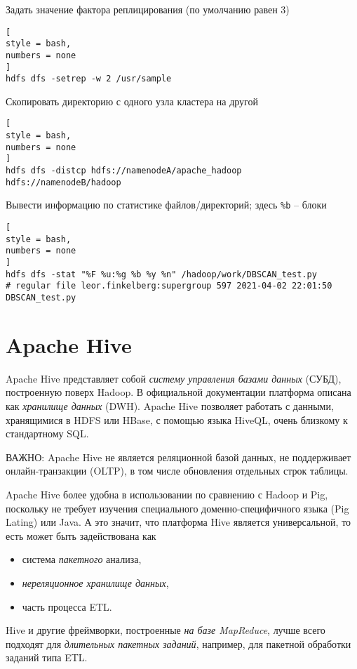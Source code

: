 \documentclass[%
	11pt,
	a4paper,
	utf8,
		]{article}
\begin{document}
Задать значение фактора реплицирования (по умолчанию равен 3)
\begin{lstlisting}[
style = bash,
numbers = none	
]
hdfs dfs -setrep -w 2 /usr/sample
\end{lstlisting}

Скопировать директорию с одного узла кластера на другой
\begin{lstlisting}[
style = bash,
numbers = none	
]
hdfs dfs -distcp hdfs://namenodeA/apache_hadoop hdfs://namenodeB/hadoop
\end{lstlisting}

Вывести информацию по статистике файлов/директорий; здесь \verb|%b| -- блоки
\begin{lstlisting}[
style = bash,
numbers = none	
]
hdfs dfs -stat "%F %u:%g %b %y %n" /hadoop/work/DBSCAN_test.py
# regular file leor.finkelberg:supergroup 597 2021-04-02 22:01:50 DBSCAN_test.py
\end{lstlisting}


\section{Apache Hive}

Apache Hive представляет собой \emph{систему управления базами данных} (СУБД), построенную поверх Hadoop. В официальной документации платформа описана как \emph{хранилище данных} (DWH). Apache Hive позволяет работать с данными, хранящимися в HDFS или HBase, с помощью языка HiveQL, очень близкому к стандартному SQL.

ВАЖНО: Apache Hive не является реляционной базой данных, не поддерживает онлайн-транзакции (OLTP), в том числе обновления отдельных строк таблицы.

Apache Hive более удобна в использовании по сравнению с Hadoop и Pig, поскольку не требует изучения специального доменно-специфичного языка (Pig Lating) или Java. А это значит, что платформа Hive является универсальной, то есть может быть задействована как
\begin{itemize}
	\item система \emph{пакетного} анализа,
	
	\item \emph{нереляционное хранилище данных},
	
	\item часть процесса ETL.
\end{itemize}

Hive и другие фреймворки, построенные \emph{на базе MapReduce}, лучше всего подходят для \emph{длительных пакетных заданий}, например, для пакетной обработки заданий типа ETL.
\end{document}
